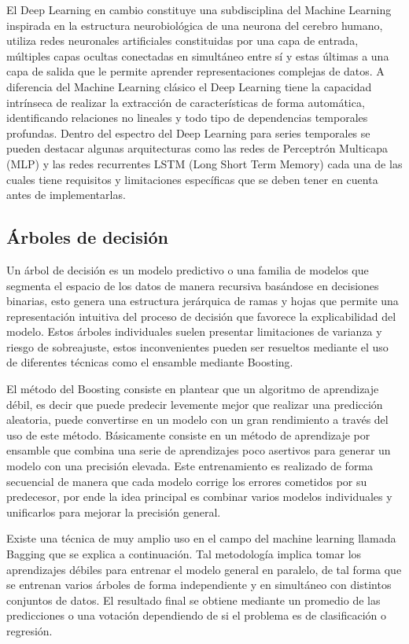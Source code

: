 El Deep Learning en cambio constituye una subdisciplina del Machine Learning inspirada en la estructura neurobiológica de una neurona del cerebro humano, utiliza redes neuronales artificiales constituidas por una capa de entrada, múltiples capas ocultas conectadas en simultáneo entre sí y estas últimas a una capa de salida que le permite aprender representaciones complejas de datos. A diferencia del Machine Learning clásico el Deep Learning tiene la capacidad intrínseca de realizar la extracción de características de forma automática, identificando relaciones no lineales y todo tipo de dependencias temporales profundas. Dentro del espectro del Deep Learning para series temporales se pueden destacar algunas arquitecturas como las redes de Perceptrón Multicapa (MLP) y las redes recurrentes LSTM (Long Short Term Memory) cada una de las cuales tiene requisitos y limitaciones específicas que se deben tener en cuenta antes de implementarlas.

\subsection{Árboles de decisión}\label{uxe1rboles-de-decisiuxf3n}

Un árbol de decisión es un modelo predictivo o una familia de modelos que segmenta el espacio de los datos de manera recursiva basándose en decisiones binarias, esto genera una estructura jerárquica de ramas y hojas que permite una representación intuitiva del proceso de decisión que favorece la explicabilidad del modelo. Estos árboles individuales suelen presentar limitaciones de varianza y riesgo de sobreajuste, estos inconvenientes pueden ser resueltos mediante el uso de diferentes técnicas como el ensamble mediante Boosting.

El método del Boosting consiste en plantear que un algoritmo de aprendizaje débil, es decir que puede predecir levemente mejor que realizar una predicción aleatoria, puede convertirse en un modelo con un gran rendimiento a través del uso de este método. Básicamente consiste en un método de aprendizaje por ensamble que combina una serie de aprendizajes poco asertivos para generar un modelo con una precisión elevada. Este entrenamiento es realizado de forma secuencial de manera que cada modelo corrige los errores cometidos por su predecesor, por ende la idea principal es combinar varios modelos individuales y unificarlos para mejorar la precisión general.

Existe una técnica de muy amplio uso en el campo del machine learning llamada Bagging que se explica a continuación. Tal metodología implica tomar los aprendizajes débiles para entrenar el modelo general en paralelo, de tal forma que se entrenan varios árboles de forma independiente y en simultáneo con distintos conjuntos de datos. El resultado final se obtiene mediante un promedio de las predicciones o una votación dependiendo de si el problema es de clasificación o regresión.

